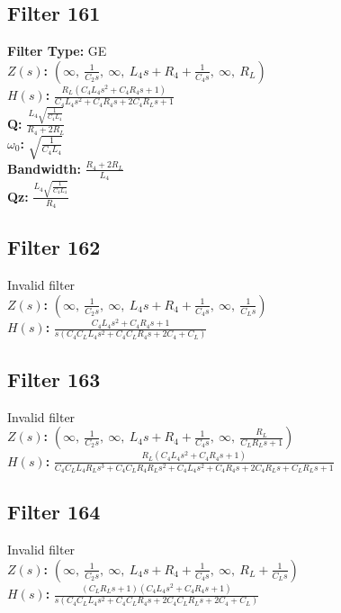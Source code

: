 \documentclass{article}
\begin{document}
\subsection*{Filter 161}
\textbf{Filter Type:} GE \\ 
\textbf{$Z(s)$:} $\left( \infty, \  \frac{1}{C_{2} s}, \  \infty, \  L_{4} s + R_{4} + \frac{1}{C_{4} s}, \  \infty, \  R_{L}\right)$ \\ 
\textbf{$H(s)$:} $\frac{R_{L} \left(C_{4} L_{4} s^{2} + C_{4} R_{4} s + 1\right)}{C_{4} L_{4} s^{2} + C_{4} R_{4} s + 2 C_{4} R_{L} s + 1}$ \\ 
\textbf{Q:} $\frac{L_{4} \sqrt{\frac{1}{C_{4} L_{4}}}}{R_{4} + 2 R_{L}}$ \\ 
\textbf{$\omega_0$:} $\sqrt{\frac{1}{C_{4} L_{4}}}$ \\ 
\textbf{Bandwidth:} $\frac{R_{4} + 2 R_{L}}{L_{4}}$ \\ 
\textbf{Qz:} $\frac{L_{4} \sqrt{\frac{1}{C_{4} L_{4}}}}{R_{4}}$ \\ 
\subsection*{Filter 162}
Invalid filter \\ 
\textbf{$Z(s)$:} $\left( \infty, \  \frac{1}{C_{2} s}, \  \infty, \  L_{4} s + R_{4} + \frac{1}{C_{4} s}, \  \infty, \  \frac{1}{C_{L} s}\right)$ \\ 
\textbf{$H(s)$:} $\frac{C_{4} L_{4} s^{2} + C_{4} R_{4} s + 1}{s \left(C_{4} C_{L} L_{4} s^{2} + C_{4} C_{L} R_{4} s + 2 C_{4} + C_{L}\right)}$ \\ 
\subsection*{Filter 163}
Invalid filter \\ 
\textbf{$Z(s)$:} $\left( \infty, \  \frac{1}{C_{2} s}, \  \infty, \  L_{4} s + R_{4} + \frac{1}{C_{4} s}, \  \infty, \  \frac{R_{L}}{C_{L} R_{L} s + 1}\right)$ \\ 
\textbf{$H(s)$:} $\frac{R_{L} \left(C_{4} L_{4} s^{2} + C_{4} R_{4} s + 1\right)}{C_{4} C_{L} L_{4} R_{L} s^{3} + C_{4} C_{L} R_{4} R_{L} s^{2} + C_{4} L_{4} s^{2} + C_{4} R_{4} s + 2 C_{4} R_{L} s + C_{L} R_{L} s + 1}$ \\ 
\subsection*{Filter 164}
Invalid filter \\ 
\textbf{$Z(s)$:} $\left( \infty, \  \frac{1}{C_{2} s}, \  \infty, \  L_{4} s + R_{4} + \frac{1}{C_{4} s}, \  \infty, \  R_{L} + \frac{1}{C_{L} s}\right)$ \\ 
\textbf{$H(s)$:} $\frac{\left(C_{L} R_{L} s + 1\right) \left(C_{4} L_{4} s^{2} + C_{4} R_{4} s + 1\right)}{s \left(C_{4} C_{L} L_{4} s^{2} + C_{4} C_{L} R_{4} s + 2 C_{4} C_{L} R_{L} s + 2 C_{4} + C_{L}\right)}$ \\ 
\end{document}
